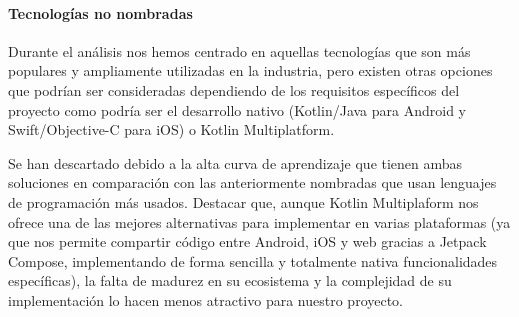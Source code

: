 \paragraph{Tecnologías no nombradas}
Durante el análisis nos hemos centrado en aquellas tecnologías que son más populares y ampliamente utilizadas en la industria, pero existen otras opciones que podrían ser consideradas dependiendo de los requisitos específicos del proyecto como podría ser el desarrollo nativo (Kotlin/Java para Android y Swift/Objective-C para iOS) o Kotlin Multiplatform.

Se han descartado debido a la alta curva de aprendizaje que tienen ambas soluciones en comparación con las anteriormente nombradas que usan lenguajes de programación más usados. Destacar que, aunque Kotlin Multiplaform nos ofrece una de las mejores alternativas para implementar en varias plataformas (ya que nos permite compartir código entre Android, iOS y web gracias a Jetpack Compose, implementando de forma sencilla y totalmente nativa funcionalidades específicas), la falta de madurez en su ecosistema y la complejidad de su implementación lo hacen menos atractivo para nuestro proyecto.
